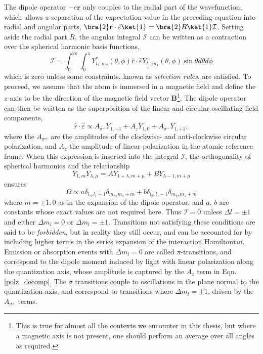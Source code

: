 	The dipole operator $-e\textbf{r}$ only couples to the radial part of the wavefunction, which allows a separation of the expectation value in the preceding equation into radial and angular parts, $\bra{2}\textbf{r}\cdot\hat{\varepsilon}\ket{1} = \bra{2}R\ket{1}\mathcal{I}$.
	Setting aside the radial part $R$, the angular integral $\mathcal{I}$ can be written as a contraction over the spherical harmonic basis functions, 
	\begin{equation}
		\mathcal{I}=\int_{0}^{2\pi}\int_{0}^{\pi} Y^{*}_{l_2,m_2}(\theta,\phi)\hat{r}\cdot\hat{\varepsilon}Y_{l_1,m_1}(\theta,\phi)\sin\theta d\theta d\phi
	\end{equation} 
	which is zero unless some constraints, known as \emph{selection rules}, are satisfied.
	To proceed, we assume that the atom is immersed in a magnetic field and define the $z$ axis to be the direction of the magnetic field vector $\textbf{B}$\footnote{This is true for almost all the contexts we encounter in this thesis, but where a magnetic axis is not present, one should perform an average over all angles as required.}.
	The dipole operator can then be written as the superposition of the linear and circular oscillating field components,  
	\begin{equation}
		\hat{r}\cdot\hat{\varepsilon}\propto A_{\sigma^-}Y_{1,-1} + A_z Y_{1,0} + A_{\sigma^+}Y_{1,+1},
		\label{polz_decomp}
	\end{equation}
	where the $A_{\sigma^\pm}$ are the amplitudes of the clockwise- and anti-clockwise circular polarization, and $A_z$ the amplitude of linear polarization in the atomic reference frame.
	When this expression is inserted into the integral $\mathcal{I}$, the orthogonality of spherical harmonics and the relationship
	\begin{equation}
		Y_{1,m}Y_{\lambda,\mu}= A Y_{1+\lambda,m+\mu}+BY_{\lambda-1,m+\mu}
	\end{equation}
	 ensures
	\begin{equation}
		\Omega\propto a\delta_{l_2,l_1+1}\delta_{m_2,m_1+m} + b\delta_{l_2,l_1-1}\delta_{m_2,m_1+m}
	\end{equation}
	where $m=\pm1,0$ as in the expansion of the dipole operator, and $a$, $b$ are constants whose exact values are not required here.
	Thus $\mathcal{I}=0$ unless $\Delta l=\pm1$ and either $\Delta m_l=0$ or $\Delta m_l=\pm1$.
	Transitions not satisfying these conditions are said to be \emph{forbidden}, but in reality they still occur, and can be accounted for by including higher terms in the series expansion of the interaction Hamiltonian.
	Emission or absorption events with $\Delta m_l=0$ are called $\pi$-transitions, and correspond to the dipole moment induced by light with linear polarization along the quantization axis, whose amplitude is captured by the $A_z$ term in Eqn.
	\ref{polz_decomp}.
	The $\sigma$ transitions couple to oscillations in the plane normal to the quantization axis, and correspond to transitions where $\Delta m_l=\pm 1$, driven by the $A_{\sigma^\pm}$ terms.
	
